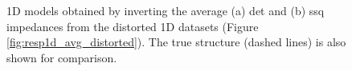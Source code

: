 	

	




\begin{figure}[ht]
	\centering
	\caption[Inverted models from average det and ssq impedances from distorted 1D datasets]{1D models obtained by inverting the average (a) det and (b) ssq impedances from the distorted 1D datasets (Figure \ref{fig:resp1d_avg_distorted}). The true structure (dashed lines) is also shown for comparison.}
	\label{fig:resp1d_avg_distorted_model}
\end{figure}
